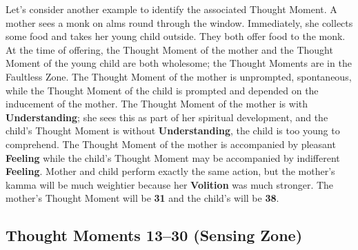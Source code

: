 Let’s consider another example to identify the associated Thought Moment. A mother sees a monk on alms round through the window. Immediately, she collects some food and takes her young child outside. They both offer food to the monk. At the time of offering, the Thought Moment of the mother and the Thought Moment of the young child are both wholesome; the Thought Moments are in the Faultless Zone. The Thought Moment of the mother is unprompted, spontaneous, while the Thought Moment of the child is prompted and depended on the inducement of the mother. The Thought Moment of the mother is with \textbf{Understanding}; she sees this as part of her spiritual development, and the child’s Thought Moment is without \textbf{Understanding}, the child is too young to comprehend. The Thought Moment of the mother is accompanied by pleasant \textbf{Feeling} while the child’s Thought Moment may be accompanied by indifferent \textbf{Feeling}. Mother and child perform exactly the same action, but the mother’s kamma will be much weightier because her \textbf{Volition} was much stronger. The mother’s Thought Moment will be \textbf{31} and the child’s will be \textbf{38}.

\subsection*{Thought Moments 13--30 (Sensing Zone)}

